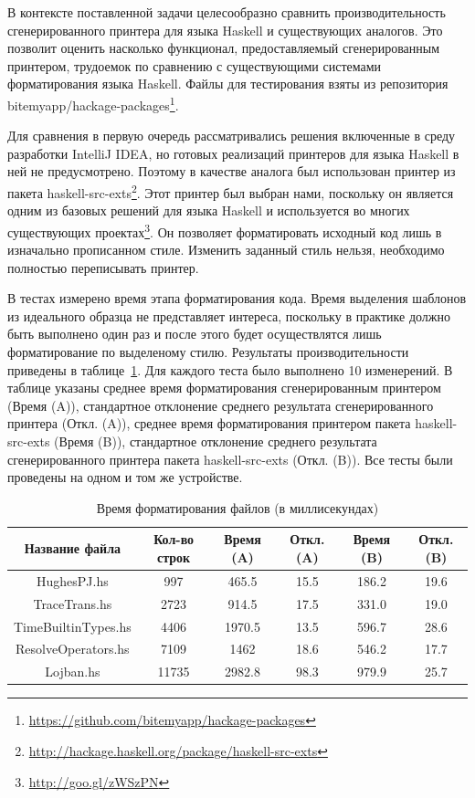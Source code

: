 В контексте поставленной задачи целесообразно сравнить производительность сгенерированного принтера для языка Haskell и существующих аналогов. Это позволит оценить насколько функционал, предоставляемый сгенерированным принтером, трудоемок по сравнению с существующими системами форматирования языка Haskell. Файлы для тестирования взяты из репозитория bitemyapp/hackage-packages\footnote{\url{https://github.com/bitemyapp/hackage-packages}}. 

Для сравнения в первую очередь рассматривались решения включенные в среду разработки IntelliJ IDEA, но готовых реализаций принтеров для языка Haskell в ней не предусмотрено. Поэтому в качестве аналога был использован принтер из пакета haskell-src-exts\footnote{\url{http://hackage.haskell.org/package/haskell-src-exts}}. Этот принтер был выбран нами, поскольку он является одним из базовых решений для языка Haskell и используется во многих существующих проектах\footnote{\url{http://goo.gl/zWSzPN}}. Он позволяет форматировать исходный код лишь в изначально прописанном стиле. Изменить заданный стиль нельзя, необходимо полностью переписывать принтер. 

В тестах измерено время этапа форматирования кода. Время выделения шаблонов из идеального образца не представляет интереса, поскольку в практике должно быть выполнено один раз и после этого будет осуществлятся лишь форматирование по выделеному стилю. Результаты производительности приведены в
таблице~\ref{HaskellPerformanceTbl}. Для каждого теста было выполнено 10 изменерений. В таблице указаны среднее время форматирования сгенерированным принтером (Время (A)), стандартное отклонение среднего результата сгенерированного принтера (Откл. (A)), среднее время форматирования принтером пакета haskell-src-exts (Время (B)), стандартное отклонение среднего результата сгенерированного принтера пакета haskell-src-exts (Откл. (B)). Все тесты были проведены на одном и том же устройстве.

\begin{table}[H]
\begin{center}
{\scriptsize
\begin{tabular}{|c|c|c|c|c|c|}
\hline
Название файла & Кол-во строк & Время (A) & Откл. (A) & Время (B) & Откл. (B)\\
\hline
HughesPJ.hs & 997 & 465.5 & 15.5 & 186.2 & 19.6\\
TraceTrans.hs & 2723 & 914.5 & 17.5 & 331.0 & 19.0\\
TimeBuiltinTypes.hs & 4406 & 1970.5 & 13.5 & 596.7 & 28.6\\
ResolveOperators.hs & 7109 & 1462 & 18.6 & 546.2 & 17.7\\
Lojban.hs & 11735 & 2982.8 & 98.3 & 979.9 & 25.7\\
\hline
\end{tabular}}
\end{center}
\caption{\label{HaskellPerformanceTbl}Время форматирования файлов (в миллисекундах)}
\end{table} 

